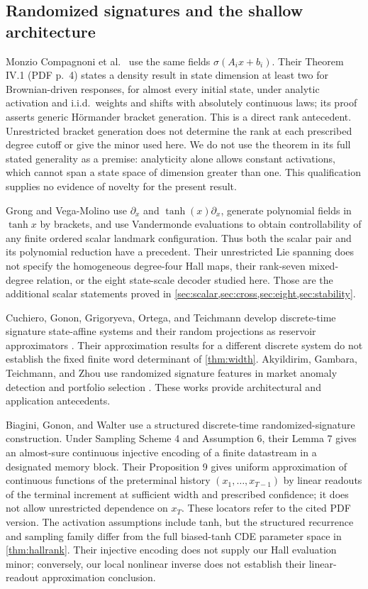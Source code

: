 \documentclass[11pt,a4paper]{article}
\numberwithin{equation}{section}
\theoremstyle{definition}
\theoremstyle{remark}
\begin{document}
\subsection{Randomized signatures and the shallow architecture}
Monzio Compagnoni et al.\ \cite[Definition II.5]{MonzioCompagnoni} use
the same fields $\sigma(A_i x+b_i)$. Their Theorem IV.1 (PDF p.~4)
states a density result in state dimension at least two for
Brownian-driven responses, for almost every initial state, under analytic
activation and i.i.d.\ weights and shifts with absolutely continuous laws; its
proof asserts generic H\"ormander bracket generation. This is a direct
rank antecedent. Unrestricted bracket generation does not determine
the rank at each prescribed degree cutoff or give the minor used here.
We do not use the theorem in its full stated generality as a premise:
analyticity alone allows constant activations, which cannot span a
state space of dimension greater than one. This qualification supplies
no evidence of novelty for the present result.

Grong and Vega-Molino \cite[Remark 3.2]{GrongVegaMolino} use
$\partial_x$ and $\tanh(x)\partial_x$, generate polynomial fields in
$\tanh x$ by brackets, and use Vandermonde evaluations to obtain
controllability of any finite ordered scalar landmark configuration.
Thus both the scalar pair and its polynomial reduction have a precedent.
Their unrestricted Lie spanning does not specify the homogeneous
degree-four Hall maps, their rank-seven mixed-degree relation, or the
eight state-scale decoder studied here. Those are the additional scalar
statements proved in \cref{sec:scalar,sec:cross,sec:eight,sec:stability}.

Cuchiero, Gonon, Grigoryeva, Ortega, and Teichmann develop discrete-time
signature state-affine systems and their random projections as reservoir
approximators \cite{Cuchiero}. Their approximation results for a different
discrete system do not establish the fixed finite word determinant of
\cref{thm:width}. Akyildirim, Gambara, Teichmann, and Zhou use randomized
signature features in market anomaly detection and portfolio selection
\cite{AkyildirimAnomaly,AkyildirimPortfolio}. These works provide
architectural and application antecedents.

Biagini, Gonon, and Walter \cite{BiaginiGononWalter} use a structured
discrete-time randomized-signature construction. Under Sampling
Scheme 4 and Assumption 6, their Lemma 7 gives an almost-sure
continuous injective encoding of a finite datastream in a designated
memory block. Their Proposition 9 gives uniform approximation of continuous
functions of the preterminal history $(x_1,\ldots,x_{T-1})$ by linear
readouts of the terminal increment at sufficient width and prescribed
confidence; it does not allow unrestricted dependence on $x_T$.
These locators refer to the cited PDF version.
The activation assumptions include tanh, but the structured recurrence
and sampling family differ from the full biased-tanh CDE parameter
space in \cref{thm:hallrank}. Their injective encoding does not supply
our Hall evaluation minor; conversely, our local nonlinear inverse
does not establish their linear-readout approximation conclusion.
\end{document}
